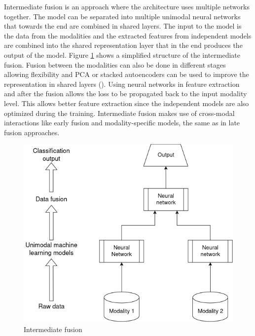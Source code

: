 Intermediate fusion is an approach where the architecture uses multiple networks together. The model can be separated into multiple unimodal neural networks that towards the end are combined in shared layers. The input to the model is the data from the modalities and the extracted features from independent models are combined into the shared representation layer that in the end produces the output of the model. Figure \ref{fig:intermediate} shows a simplified structure of the intermediate fusion. Fusion between the modalities can also be done in different stages allowing flexibility and PCA or stacked autoencoders can be used to improve the representation in shared layers (\cite{8103116}). Using neural networks in feature extraction and after the fusion allows the loss to be propagated back to the input modality level. This allows better feature extraction since the independent models are also optimized during the training. Intermediate fusion makes use of cross-modal interactions like early fusion and modality-specific models, the same as in late fusion approaches.

\begin{figure}
    \centering
    \includegraphics[width=0.5\linewidth]{template//figures/IntermediateFusion_white.png}
    \caption{Intermediate fusion}
    \label{fig:intermediate}
\end{figure}

